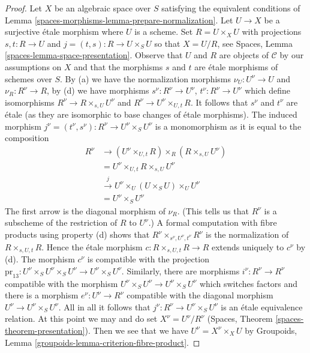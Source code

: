 \begin{proof}
\medskip\noindent
Let $X$ be an algebraic space over $S$ satisfying
the equivalent conditions of Lemma \ref{spaces-morphisms-lemma-prepare-normalization}.
Let $U \to X$ be a surjective \'etale morphism where $U$ is a scheme.
Set $R = U \times_X U$ with projections $s, t : R \to U$ and
$j = (t, s) : R \to U \times_S U$ so that $X = U/R$, see
Spaces, Lemma \ref{spaces-lemma-space-presentation}.
Observe that $U$ and $R$ are objects of $\mathcal{C}$
by our assumptions on $X$ and that the morphisms
$s$ and $t$ are \'etale morphisms of schemes over $S$.
By (a) we have the normalization morphisms
$\nu_U : U^\nu \to U$ and $\nu_R : R^\nu \to R$,
by (d) we have morphisms $s^\nu : R^\nu \to U^\nu$,
$t^\nu : R^\nu \to U^\nu$ which define
isomorphisms $R^\nu \to R \times_{s, U} U^\nu$ and
$R^\nu \to U^\nu \times_{U, t} R$. It follows that
$s^\nu$ and $t^\nu$ are \'etale (as they are isomorphic
to base changes of \'etale morphisms). The induced morphism
$j^\nu = (t^\nu, s^\nu) : R^\nu \to U^\nu \times_S U^\nu$
is a monomorphism as it is equal to the composition
\begin{align*}
R^\nu
& \to
(U^\nu \times_{U, t} R) \times_R (R \times_{s, U} U^\nu) \\
& =
U^\nu \times_{U, t} R \times_{s, U} U^\nu \\
& \xrightarrow{j}
U^\nu \times_U (U \times_S U) \times_U U^\nu \\
& =
U^\nu \times_S U^\nu
\end{align*}
The first arrow is the diagonal morphism of $\nu_R$.
(This tells us that $R^\nu$ is a subscheme of the restriction of
$R$ to $U^\nu$.) A formal computation with fibre products
using property (d) shows that
$R^\nu \times_{s^\nu, U^\nu, t^\nu} R^\nu$ is the normalization
of $R \times_{s, U, t} R$. Hence the \'etale morphism
$c : R \times_{s, U, t} R \to R$ extends uniquely to $c^\nu$ by (d).
The morphism $c^\nu$ is compatible with the projection
$\text{pr}_{13} : U^\nu \times_S U^\nu \times_S U^\nu \to U^\nu \times_S U^\nu$.
Similarly, there are morphisms $i^\nu : R^\nu \to R^\nu$
compatible with the morphism $U^\nu \times_S U^\nu \to U^\nu \times_S U^\nu$
which switches factors and there is a morphism $e^\nu : U^\nu \to R^\nu$
compatible with the diagonal morphism $U^\nu \to U^\nu \times_S U^\nu$.
All in all it follows that $j^\nu : R^\nu \to U^\nu \times_S U^\nu$
is an \'etale equivalence relation.
At this point we may and do set $X^\nu = U^\nu/R^\nu$
(Spaces, Theorem \ref{spaces-theorem-presentation}).
Then we see that we have $U^\nu = X^\nu \times_X U$ by
Groupoids, Lemma \ref{groupoids-lemma-criterion-fibre-product}.


\end{proof}

